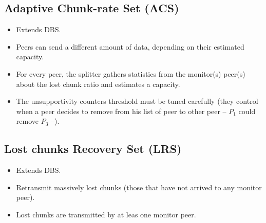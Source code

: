 \documentclass{article}
\begin{document}
\ifx \HCode\Undfef
\else
{}
\fi


\subsection{Adaptive Chunk-rate Set (ACS)}

\begin{itemize}
\item Extends DBS.
\item Peers can send a different amount of data, depending on their
  estimated capacity.
\item For every peer, the splitter gathers statistics from the
  monitor(s) peer(s) about the lost chunk ratio and estimates a
  capacity.
\item The unsupportivity counters threshold must be tuned carefully
  (they control when a peer decides to remove from his list of peer to
  other peer -- $P_1$ could remove $P_3$ --).
\end{itemize}

\ifx \HCode\Undfef
\else
{}
\fi


\subsection{Lost chunks Recovery Set (LRS)}

\begin{itemize}
\item Extends DBS.
\item Retransmit massively lost chunks (those that have not arrived to
  any monitor peer).
\item Lost chunks are transmitted by at leas one monitor peer.
\end{itemize}

\ifx \HCode\Undfef
\else
{}
\fi
\end{document}
